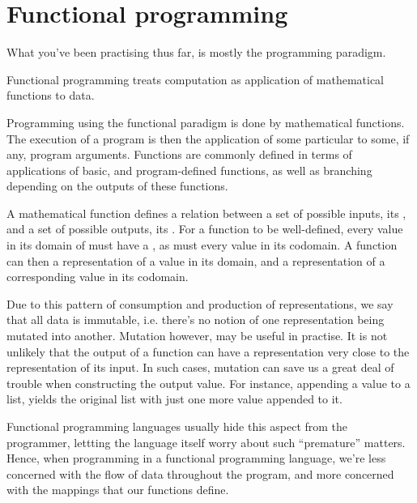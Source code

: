 \section{Functional programming}

What you've been practising thus far, is mostly the 
programming paradigm.

\begin{definition}

Functional programming treats computation as application of mathematical
functions to  data.

\end{definition}

Programming using the functional paradigm is done by 
mathematical functions. The execution of a program is then the application of
some particular  to some, if any, program arguments.
Functions are commonly defined in terms of applications of basic, and
program-defined functions, as well as branching depending on the outputs of
these functions.

A mathematical function defines a relation between a set of possible inputs,
its , and a set of possible outputs, its . For a
function to be well-defined, every value in its domain of must have a
, as must every value in its codomain\footnotemark.
A function can then  a representation of a value in its domain,
and  a representation of a corresponding value in its codomain.


Due to this pattern of consumption and production of representations, we say
that all data is immutable, i.e. there's no notion of one representation being
mutated into another. Mutation however, may be useful in practise. It is not
unlikely that the output of a function can have a representation very close to
the representation of its input. In such cases, mutation can save us a great
deal of trouble when constructing the output value. For instance, appending a
value to a list, yields the original list with just one more value appended to
it.

Functional programming languages usually hide this aspect from the programmer,
lettting the language itself worry about such ``premature'' matters. Hence,
when programming in a functional programming language, we're less concerned
with the flow of data throughout the program, and more concerned with the
mappings that our functions define.
